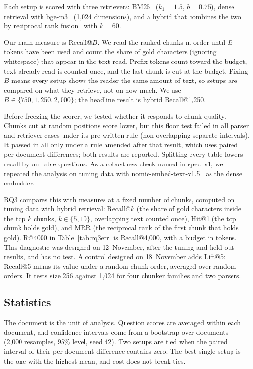 Each setup is scored with three retrievers: BM25~\cite{bm25} ($k_1=1.5$,
$b=0.75$), dense retrieval with bge-m3~\cite{chen2024m3} (1,024 dimensions), and a
hybrid that combines the two by reciprocal rank fusion~\cite{rrf} with $k=60$.

Our main measure is Recall@$B$. We read the ranked chunks in order until $B$
tokens have been used and count the share of gold characters (ignoring
whitespace) that appear in the text read. Prefix tokens count toward the
budget, text already read is counted once, and the last chunk is cut at the
budget. Fixing $B$ means every setup shows the reader the same amount of text,
so setups are compared on what they retrieve, not on how much. We use
$B \in \{750, 1{,}250, 2{,}000\}$; the headline result is hybrid
Recall@1,250.

Before freezing the scorer, we tested whether it responds to chunk quality.
Chunks cut at random positions score \SanityFloorLower{} lower, but this floor
test failed in all \SanityFloorFailedOriginal{} parser and retriever cases under
its pre-written rule (non-overlapping separate intervals). It passed in all
\SanityFloorCases{} only under a rule amended after that result, which uses paired
per-document differences; both results are reported. Splitting every
table lowers recall by \SanityDamageDrop{} on \SanityDamageQuestions{} table questions. As a robustness
check named in spec~v1, we repeated the analysis on tuning data with
nomic-embed-text-v1.5~\cite{nomic} as the dense embedder.

RQ3 compares this with measures at a fixed number of chunks, computed on tuning
data with hybrid retrieval: Recall@$k$ (the share of gold characters inside the
top $k$ chunks, $k \in \{5, 10\}$, overlapping text counted once), Hit@1 (the top
chunk holds gold), and MRR (the reciprocal rank of the first chunk that holds
gold). R@4000 in Table~\ref{tab:rq3err} is Recall@4,000, with a budget in tokens.
This diagnostic was designed on 12~November, after the tuning and held-out
results, and has no test. A control designed on 18~November adds Lift@5:
Recall@5 minus its value under a random chunk order, averaged over \RandomOrders{} random
orders. It tests size 256 against 1,024 for four chunker families and two
parsers.

\subsection{Statistics}\label{sec:stats}

The document is the unit of analysis. Question scores are averaged within each
document, and confidence intervals come from a bootstrap over
documents~\cite{bootstrap} (2,000 resamples, 95\% level, seed 42). Two setups
are tied when the paired interval of their per-document difference contains
zero. The best single setup is the one with the highest mean, and cost does
not break ties.

